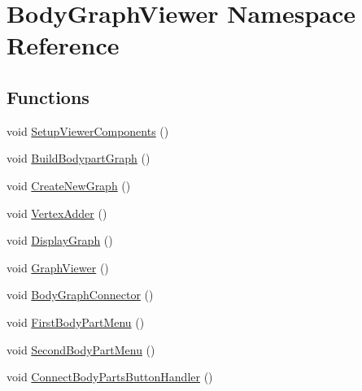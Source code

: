 \hypertarget{namespace_body_graph_viewer}{}\section{Body\+Graph\+Viewer Namespace Reference}
\label{namespace_body_graph_viewer}
\subsection*{Functions}
\begin{DoxyCompactItemize}
\item 
void \mbox{\hyperlink{namespace_body_graph_viewer_ae2458c73737cf4926078c6415ee2087b}{Setup\+Viewer\+Components}} ()
\item 
void \mbox{\hyperlink{namespace_body_graph_viewer_a0afc56c4f90396362e310ee53d40658b}{Build\+Bodypart\+Graph}} ()
\item 
void \mbox{\hyperlink{namespace_body_graph_viewer_ae8fa18b34d0a6c141c3257cdb7899f38}{Create\+New\+Graph}} ()
\item 
void \mbox{\hyperlink{namespace_body_graph_viewer_a84ae9cb3a7a4441cd2f55037b98ddcaf}{Vertex\+Adder}} ()
\item 
void \mbox{\hyperlink{namespace_body_graph_viewer_a4f4bee772e1d2c1133111866dd88f140}{Display\+Graph}} ()
\item 
void \mbox{\hyperlink{namespace_body_graph_viewer_af9dda6b999602264957b77351415c57d}{Graph\+Viewer}} ()
\item 
void \mbox{\hyperlink{namespace_body_graph_viewer_a269151dfadc20a939854d1187a7ef914}{Body\+Graph\+Connector}} ()
\item 
void \mbox{\hyperlink{namespace_body_graph_viewer_a7a0ddd4c8da17a236fb1b160d43d6c72}{First\+Body\+Part\+Menu}} ()
\item 
void \mbox{\hyperlink{namespace_body_graph_viewer_a8f24a618383585f0b013da6054244e2c}{Second\+Body\+Part\+Menu}} ()
\item 
void \mbox{\hyperlink{namespace_body_graph_viewer_a9722a49a47d752678a7508ca1c10e6ad}{Connect\+Body\+Parts\+Button\+Handler}} ()
\end{DoxyCompactItemize}
